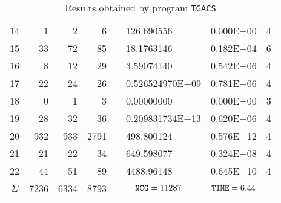 \documentclass{esub2acm}
\begin{document}
\begin{table}
\begin{tabular}{c|rrrr@{}lcc}
14  &   1   &   2   &   6   &       &   126.690556  &   0.000E+00   &   4   \\
15  &   33  &   72  &   85  &       &   18.1763146  &   0.182E$-$04 &   6   \\
16  &   8   &   12  &   29  &       &   3.59074140  &   0.542E$-$06 &   4   \\
17  &   22  &   24  &   26  &       &   0.526524970E$-$09   &   0.781E$-$06 &   4   \\
18  &   0   &   1   &   3   &       &   0.00000000  &   0.000E+00   &   3   \\
19  &   28  &   32  &   36  &       &   0.209831734E$-$13   &   0.620E$-$06 &   4   \\
20  &   932 &   933 &   2791    &       &   498.800124  &   0.576E$-$12 &   4   \\
21  &   21  &   22  &   34  &       &   649.598077  &   0.324E$-$08 &   4   \\
22  &   44  &   51  &   89  &       &   4488.96148  &   0.645E$-$10 &   4   \\ \hline
$\Sigma$\rule[-2pt]{0pt}{12pt}  &   7236    &   6334    &   8793    &   \multicolumn{2}{c}{${\tt NCG} = 11287$}  &   ${\tt TIME} = 6.44$ & \\ \hline
\end{tabular}
\caption{Results obtained by program {\tt TGACS}}
\label{tgacs}
\end{table}

\clearpage
\end{document}
